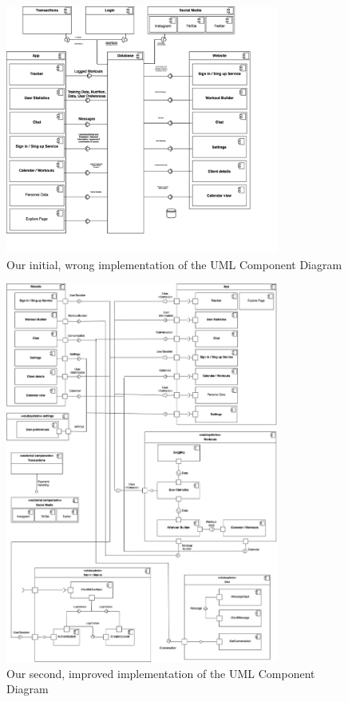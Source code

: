 \begin{figure}[H]
    \centering
    \includegraphics[width=0.8\textwidth]{images/old_component_diagram.png}
    \caption{Our initial, wrong implementation of the UML Component Diagram}
    \label{fig:componentWrong}
\end{figure}

\begin{figure}[H]
  \centering
  \includegraphics[width=0.8\textwidth]{images/component_diagram.png}
  \caption{Our second, improved implementation of the UML Component Diagram}
  \label{fig:componentDiagram}
\end{figure}

